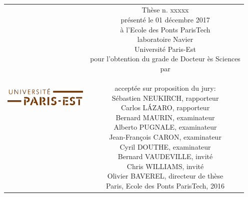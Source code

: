 \begin{titlepage}
\begin{center}
\sffamily


\null\vspace{2cm}
{\huge \mytitle} \\[24pt] 
    
\vfill

\begin{tabular} {cc}
\parbox{0.3\textwidth}{\includegraphics[width=4cm]{head/logo_upe}}
&
\parbox{0.7\textwidth}{%
	Thèse n. xxxxx\\
	présenté le 01 décembre 2017\\
	à l'Ecole des Ponts ParisTech\\
	laboratoire Navier\\
%
	Université Paris-Est\\[6pt]
	pour l'obtention du grade de Docteur ès Sciences\\
	par\\ [4pt]
	\null \hspace{3em} \myauthor\\[9pt]
%
\small
acceptée sur proposition du jury:\\[4pt]
%
    Sébastien NEUKIRCH, rapporteur\\
    Carlos LÁZARO, rapporteur\\
    Bernard MAURIN, examinateur\\
    Alberto PUGNALE, examinateur\\
    Jean-François CARON, examinateur\\
    Cyril DOUTHE, examinateur\\
    Bernard VAUDEVILLE, invité\\
    Chris WILLIAMS, invité\\
    Olivier BAVEREL, directeur de thèse\\[12pt]
%
Paris, Ecole des Ponts ParisTech, 2016}
\end{tabular}
\end{center}
\vspace{2cm}
\end{titlepage}



